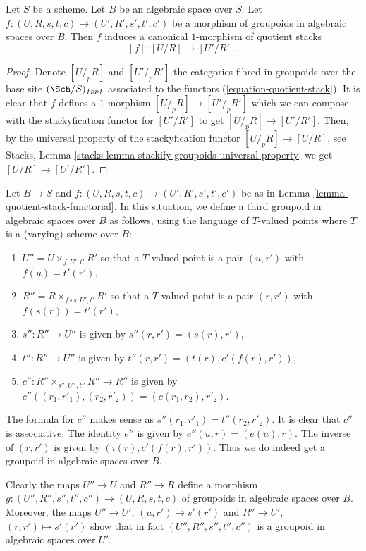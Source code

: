 \begin{lemma}
\label{lemma-quotient-stack-functorial}
Let $S$ be a scheme. Let $B$ be an algebraic space over $S$.
Let $f : (U, R, s, t, c) \to (U', R', s', t', c')$ be a morphism of
groupoids in algebraic spaces over $B$.
Then $f$ induces a canonical $1$-morphism of quotient stacks
$$
[f] : [U/R] \longrightarrow [U'/R'].
$$
\end{lemma}

\begin{proof}
Denote $[U/_{\!p}R]$ and $[U'/_{\!p}R']$ the categories fibred
in groupoids over the base site $(\Sch/S)_{fppf}$ associated to the
functors (\ref{equation-quotient-stack}). It is clear that $f$ defines
a $1$-morphism $[U/_{\!p}R] \to [U'/_{\!p}R']$ which we can compose
with the stackyfication functor for $[U'/R']$ to get $[U/_{\!p}R] \to [U'/R']$.
Then, by the universal property of the stackyfication functor
$[U/_{\!p}R] \to [U/R]$, see
Stacks, Lemma \ref{stacks-lemma-stackify-groupoids-universal-property}
we get $[U/R] \to [U'/R']$.
\end{proof}

\noindent
Let $B \to S$ and $f : (U, R, s, t, c) \to (U', R', s', t', c')$ be as in
Lemma \ref{lemma-quotient-stack-functorial}.
In this situation, we define a third groupoid in algebraic spaces over
$B$ as follows, using the language of $T$-valued points where $T$
is a (varying) scheme over $B$:
\begin{enumerate}
\item $U'' = U \times_{f, U', t'} R'$ so that a $T$-valued point is
a pair $(u, r')$ with $f(u) = t'(r')$,
\item $R'' = R \times_{f \circ s, U', t'} R'$ so that a $T$-valued point is
a pair $(r, r')$ with $f(s(r)) = t'(r')$,
\item $s'' : R'' \to U''$ is given by $s''(r, r') = (s(r), r')$,
\item $t'' : R'' \to U''$ is given by $t''(r, r') = (t(r), c'(f(r), r'))$,
\item $c'' : R'' \times_{s'', U'', t''} R'' \to R''$ is given by
$c''((r_1, r'_1), (r_2, r'_2)) = (c(r_1, r_2), r'_2)$.
\end{enumerate}
The formula for $c''$ makes sense as $s''(r_1, r'_1) = t''(r_2, r'_2)$.
It is clear that $c''$ is associative. The identity $e''$ is given by
$e''(u, r) = (e(u), r)$. The inverse of $(r, r')$ is given by
$(i(r), c'(f(r), r'))$. Thus we do indeed get a groupoid
in algebraic spaces over $B$.

\medskip\noindent
Clearly the maps $U'' \to U$ and $R'' \to R$ define a morphism
$g : (U'', R'', s'', t'', c'') \to (U, R, s, t, c)$
of groupoids in algebraic spaces over $B$. Moreover, the maps
$U'' \to U'$, $(u, r') \mapsto s'(r')$ and
$R'' \to U'$, $(r, r') \mapsto s'(r')$ show that in fact
$(U'', R'', s'', t'', c'')$ is a groupoid in algebraic spaces over $U'$.

